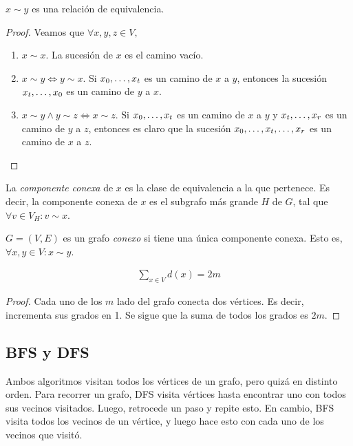 \begin{proposition}
$x \sim y$ es una relación de equivalencia.
\end{proposition}
\begin{proof}
Veamos que $\forall x,y,z \in V,$
\begin{enumerate}
    \item $x \sim x$. La sucesión de $x$ es el camino vacío.
    
    \item $x \sim y \iff y \sim x$. Si $x_0, \mathellipsis, x_t$ es un camino de $x$ a $y$, entonces la sucesión $x_t, \mathellipsis, x_0$ es un camino de $y$ a $x$.
    \item $x \sim y \wedge y \sim z \iff x \sim z$. Si $x_0, \mathellipsis, x_t$ es un camino de $x$ a $y$ y $x_{t}, \mathellipsis, x_{r}$ es un camino de $y$ a $z$, entonces es claro que la sucesión $x_0, \mathellipsis, x_t, \mathellipsis, x_r$ es un camino de $x$ a $z$.
\end{enumerate}
\end{proof}
\begin{definition}
La \emph{componente conexa} de $x$ es la clase de equivalencia a la que pertenece. Es decir, la componente conexa de $x$ es el subgrafo más grande $H$ de $G$, tal que $\forall v \in V_H \colon v \sim x$.

$G=(V,E)$ es un grafo \emph{conexo} si tiene una única componente conexa. Esto es, $\forall x,y \in V \colon x \sim y$.
\end{definition}

\begin{proposition}
\begin{align}
\sum_{x\in V} d(x) = 2m \label{handshaking_lemma}
\end{align}
\end{proposition}

\begin{proof}
Cada uno de los $m$ lado del grafo conecta dos vértices. Es decir, incrementa sus grados en 1. Se sigue que la suma de todos los grados es $2m$.
\end{proof}

\subsection{BFS y DFS}
Ambos algoritmos visitan todos los vértices de un grafo, pero quizá en distinto orden. Para recorrer un grafo, DFS visita vértices hasta encontrar uno con todos sus vecinos visitados. Luego, retrocede un paso y repite esto. En cambio, BFS visita todos los vecinos de un vértice, y luego hace esto con cada uno de los vecinos que visitó.

